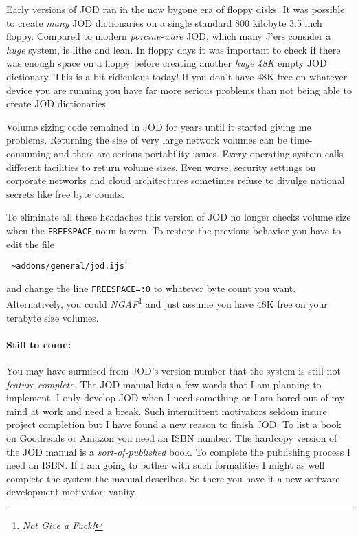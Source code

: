 Early versions of JOD ran in the now bygone era of floppy disks. It was
possible to create \emph{many} JOD dictionaries on a single standard 800
kilobyte 3.5 inch floppy. Compared to modern \emph{porcine-ware} JOD,
which many J'ers consider a \emph{huge} system, is lithe and lean. In
floppy days it was important to check if there was enough space on a
floppy before creating another \emph{huge 48K} empty JOD dictionary.
This is a bit ridiculous today! If you don't have 48K free on whatever
device you are running you have far more serious problems than not being
able to create JOD dictionaries.

Volume sizing code remained in JOD for years until it started giving me
problems. Returning the size of very large network volumes can be
time-consuming and there are serious portability issues. Every operating
system calls different facilities to return volume sizes. Even worse,
security settings on corporate networks and cloud architectures
sometimes refuse to divulge national secrets like free byte counts.

To eliminate all these headaches this version of JOD no longer checks
volume size when the \texttt{FREESPACE} noun is zero. To restore the
previous behavior you have to edit the file

\begin{tcolorbox}[breakable, size=fbox, boxrule=1pt, pad at break*=1mm,colback=cellbackground, colframe=cellborder]
\begin{verbatim}
 ~addons/general/jod.ijs`
\end{verbatim}
\end{tcolorbox}

\noindent and change the line \texttt{FREESPACE=:0} to whatever byte count you
want. Alternatively, you could
\emph{NGAF}\footnote{\emph{Not Give a Fuck!}
} and just assume you have 48K free on your terabyte size volumes.

\paragraph{Still to come:}

You may have surmised from JOD's version number that the system is still
not \emph{feature complete.} The JOD manual lists a few words that I am
planning to implement. I only develop JOD when I need something or I am
bored out of my mind at work and need a break. Such intermittent
motivators seldom insure project completion but I have found a new
reason to finish JOD. To list a book on
\href{http://www.goodreads.com/bakerjd99}{Goodreads} or Amazon you need
an \href{https://www.isbn-international.org/}{ISBN number}. The
\href{http://www.lulu.com/spotlight/bakerjd99}{hardcopy version} of the
JOD manual is a \emph{sort-of-published} book. To complete the
publishing process I need an ISBN. If I am going to bother with such
formalities I might as well complete the system the manual describes. So
there you have it a new software development motivator: vanity.

